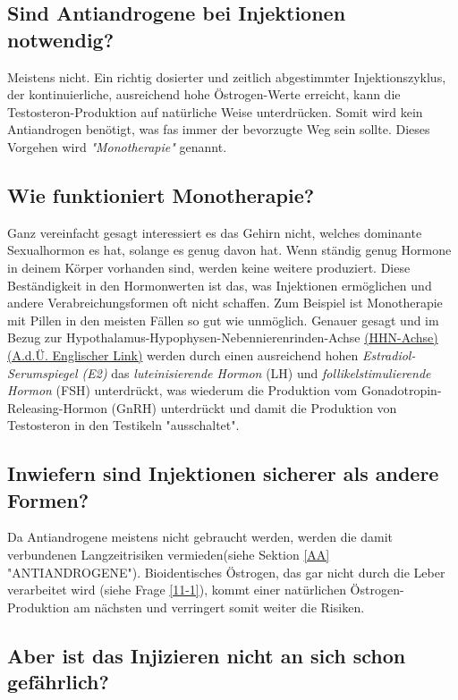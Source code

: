 \documentclass{article}
\begin{document}
\subsection{Sind Antiandrogene bei Injektionen notwendig?}

Meistens nicht. Ein richtig dosierter und zeitlich abgestimmter Injektionszyklus, der kontinuierliche, ausreichend hohe Östrogen-Werte erreicht, kann die Testosteron-Produktion auf natürliche Weise unterdrücken. Somit wird kein Antiandrogen benötigt, was fas immer der bevorzugte Weg sein sollte. Dieses Vorgehen wird \textit{"Monotherapie"} genannt.

\subsection{Wie funktioniert Monotherapie?}\label{2-3}

Ganz vereinfacht gesagt interessiert es das Gehirn nicht, welches dominante Sexualhormon es hat, solange es genug davon hat. Wenn ständig genug Hormone in deinem Körper vorhanden sind, werden keine weitere produziert. Diese Beständigkeit in den Hormonwerten ist das, was Injektionen ermöglichen und andere Verabreichungsformen oft nicht schaffen. Zum Beispiel ist Monotherapie mit Pillen in den meisten Fällen so gut wie unmöglich. Genauer gesagt und im Bezug zur Hypothalamus-Hypophysen-Nebennierenrinden-Achse \href{https://en.wikipedia.org/wiki/Hypothalamic-pituitary-gonadal_axis}{(HHN-Achse) (A.d.Ü. Englischer Link)} werden durch einen ausreichend hohen \textit{Estradiol-Serumspiegel (E2)} das \textit{luteinisierende Hormon} (LH) und \textit{follikelstimulierende Hormon} (FSH) unterdrückt, was wiederum die Produktion vom Gonadotropin-Releasing-Hormon (GnRH) unterdrückt und damit die Produktion von Testosteron in den Testikeln "ausschaltet".

\subsection{Inwiefern sind Injektionen sicherer als andere Formen?}

Da Antiandrogene meistens nicht gebraucht werden, werden die damit verbundenen Langzeitrisiken vermieden(siehe Sektion \ref{AA} "ANTIANDROGENE"). Bioidentisches Östrogen, das gar nicht durch die Leber verarbeitet wird (siehe Frage \ref{11-1}), kommt einer natürlichen Östrogen-Produktion am nächsten und verringert somit weiter die Risiken.

\subsection{Aber ist das Injizieren nicht an sich schon gefährlich?}
\end{document}

